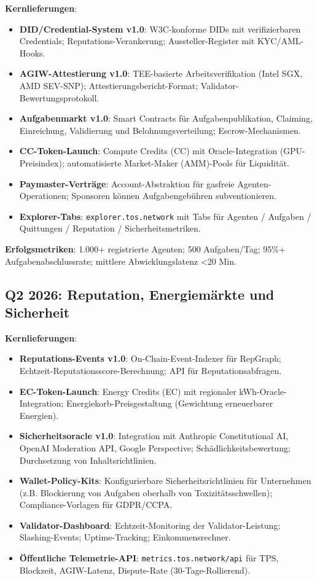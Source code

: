 \documentclass[11pt]{article}
\begin{document}
\textbf{Kernlieferungen}:
\begin{itemize}[noitemsep]
  \item \textbf{DID/Credential-System v1.0}: W3C-konforme DIDs mit verifizierbaren Credentials; Reputations-Verankerung; Aussteller-Register mit KYC/AML-Hooks.
  \item \textbf{AGIW-Attestierung v1.0}: TEE-basierte Arbeitsverifikation (Intel SGX, AMD SEV-SNP); Attestierungsbericht-Format; Validator-Bewertungsprotokoll.
  \item \textbf{Aufgabenmarkt v1.0}: Smart Contracts für Aufgabenpublikation, Claiming, Einreichung, Validierung und Belohnungsverteilung; Escrow-Mechanismen.
  \item \textbf{CC-Token-Launch}: Compute Credits (CC) mit Oracle-Integration (GPU-Preisindex); automatisierte Market-Maker (AMM)-Pools für Liquidität.
  \item \textbf{Paymaster-Verträge}: Account-Abstraktion für gasfreie Agenten-Operationen; Sponsoren können Aufgabengebühren subventionieren.
  \item \textbf{Explorer-Tabs}: \texttt{explorer.tos.network} mit Tabs für Agenten / Aufgaben / Quittungen / Reputation / Sicherheitsmetriken.
\end{itemize}

\textbf{Erfolgsmetriken}: 1.000+ registrierte Agenten; 500 Aufgaben/Tag; 95\%+ Aufgabenabschlussrate; mittlere Abwicklungslatenz <20 Min.

\subsection{Q2 2026: Reputation, Energiemärkte und Sicherheit}

\textbf{Kernlieferungen}:
\begin{itemize}[noitemsep]
  \item \textbf{Reputations-Events v1.0}: On-Chain-Event-Indexer für RepGraph; Echtzeit-Reputationsscore-Berechnung; API für Reputationsabfragen.
  \item \textbf{EC-Token-Launch}: Energy Credits (EC) mit regionaler kWh-Oracle-Integration; Energiekorb-Preisgestaltung (Gewichtung erneuerbarer Energien).
  \item \textbf{Sicherheitsoracle v1.0}: Integration mit Anthropic Constitutional AI, OpenAI Moderation API, Google Perspective; Schädlichkeitsbewertung; Durchsetzung von Inhaltsrichtlinien.
  \item \textbf{Wallet-Policy-Kits}: Konfigurierbare Sicherheitsrichtlinien für Unternehmen (z.B. Blockierung von Aufgaben oberhalb von Toxizitätsschwellen); Compliance-Vorlagen für GDPR/CCPA.
  \item \textbf{Validator-Dashboard}: Echtzeit-Monitoring der Validator-Leistung; Slashing-Events; Uptime-Tracking; Einkommensrechner.
  \item \textbf{Öffentliche Telemetrie-API}: \texttt{metrics.tos.network/api} für TPS, Blockzeit, AGIW-Latenz, Dispute-Rate (30-Tage-Rollierend).
\end{itemize}
\end{document}
